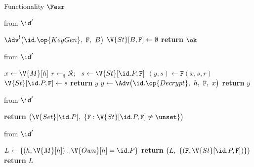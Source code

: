 \begin{interface}[nofloat]{Functionality $\Fesr$ \\
}
{\begin{multicols}{2}
 \quad from $\id'$
\begin{algorithmic}[1]
\algcont
{}
\State $\Adv^{!}\bigl(\id.\op{KeyGen},\ \mathtt{F},\ B\bigr)$ \label{ln:esrack}
\State $\V{St}[B, \mathtt{F}] \gets \emptyset$ \label{ln:esrassign}
\State \textbf{return} $\ok$
\algsave
\end{algorithmic}
\vspace{1.4ex}

\columnbreak

 \quad from $\id'$
\begin{algorithmic}[1]
\algcont
{}
\State $x \gets \V{M}[h]$
   \label{ln:esrauth}
  \State $r \gets_{\$} \mathcal{R}$; \ $s \gets \V{St}[\id.P, \mathtt{F}]$
  \State $(y, s) \gets \mathtt{F}(x, s, r)$ \label{ln:esreval}
  \State $\V{St}[\id.P, \mathtt{F}] \gets s$ \label{ln:esradvance}
  \State \textbf{return} $y$
\EndIf
\State $y \gets \Adv\bigl(\id.\op{Decrypt},\ h,\ \mathtt{F},\ x\bigr)$ \label{ln:esrcorrupt}
\State \textbf{return} $y$
\algsave
\end{algorithmic}
\vspace{1.4ex}

 \quad from $\id'$
\begin{algorithmic}[1]
\algcont
\State \textbf{return} $\bigl(\V{Set}[\id.P],\ \{\mathtt{F} : \V{St}[\id.P, \mathtt{F}] \neq \unset\}\bigr)$ \label{ln:esrstatus}
\algsave
\end{algorithmic}
\vspace{1.4ex}

 \quad from $\id'$
\begin{algorithmic}[1]
\algcont
\State $L \gets \{(h, \V{M}[h]) : \V{Own}[h] = \id.P\}$ \label{ln:esrleakown}
  \State \textbf{return} $\bigl(L,\ \{(\mathtt{F}, \V{St}[\id.P, \mathtt{F}])\}\bigr)$ \label{ln:esrleakdec}
\EndIf
\State \textbf{return} $L$
\algsave
\end{algorithmic}
\end{multicols}}
\end{interface}
